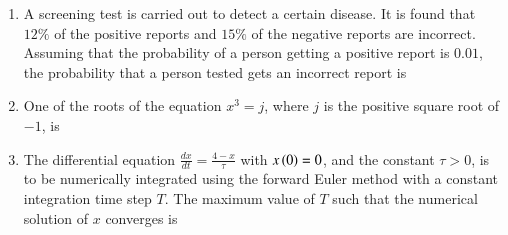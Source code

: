 \documentclass[journal,12pt,onecolumn]{IEEEtran}
\theoremstyle{remark}
\begin{document}
\begin{enumerate}
 
\item A screening test is carried out to detect a certain disease. It is found that $12\%$ of the positive reports and $15\%$ of the negative reports are incorrect. Assuming that the probability of a person getting a positive report is $0.01$, the probability that a person tested gets an incorrect report is \par \hfill{}
\begin{enumerate}
\end{enumerate}

 
\item One of the roots of the equation $x^3=j$, where $j$ is the positive square root of $-1$, is \par \hfill{}
\begin{enumerate}
\end{enumerate}

 
\item The differential equation $\frac{dx}{dt}=\frac{4-x}{\tau}$ with $x\left(0\right)=0$, and the constant $\tau>0$, is to be numerically integrated using the forward Euler method with a constant integration time step $T$. The maximum value of $T$ such that the numerical solution of $x$ converges is \hfill{}
\begin{enumerate}
\end{enumerate}


\end{enumerate}
\end{document}
